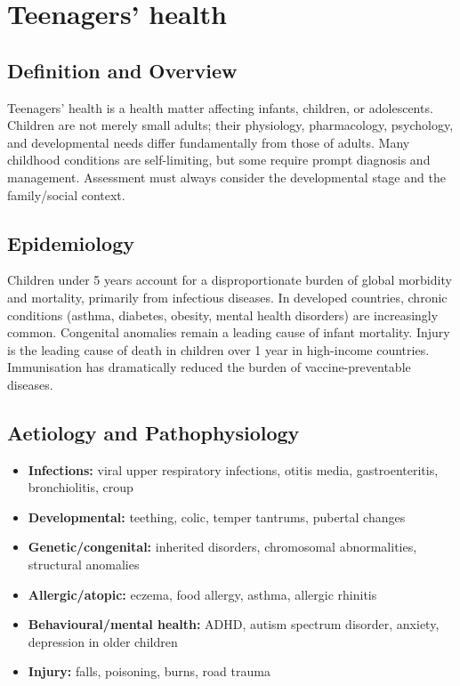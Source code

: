 \chapter{Teenagers' health}

\section*{Definition and Overview}
Teenagers' health is a health matter affecting infants, children, or adolescents. Children are not merely small adults; their physiology, pharmacology, psychology, and developmental needs differ fundamentally from those of adults. Many childhood conditions are self-limiting, but some require prompt diagnosis and management. Assessment must always consider the developmental stage and the family/social context.

\section*{Epidemiology}
Children under 5 years account for a disproportionate burden of global morbidity and mortality, primarily from infectious diseases. In developed countries, chronic conditions (asthma, diabetes, obesity, mental health disorders) are increasingly common. Congenital anomalies remain a leading cause of infant mortality. Injury is the leading cause of death in children over 1 year in high-income countries. Immunisation has dramatically reduced the burden of vaccine-preventable diseases.

\section*{Aetiology and Pathophysiology}
\begin{itemize}
    \item \textbf{Infections:} viral upper respiratory infections, otitis media, gastroenteritis, bronchiolitis, croup
    \item \textbf{Developmental:} teething, colic, temper tantrums, pubertal changes
    \item \textbf{Genetic/congenital:} inherited disorders, chromosomal abnormalities, structural anomalies
    \item \textbf{Allergic/atopic:} eczema, food allergy, asthma, allergic rhinitis
    \item \textbf{Behavioural/mental health:} ADHD, autism spectrum disorder, anxiety, depression in older children
    \item \textbf{Injury:} falls, poisoning, burns, road trauma
\end{itemize}

